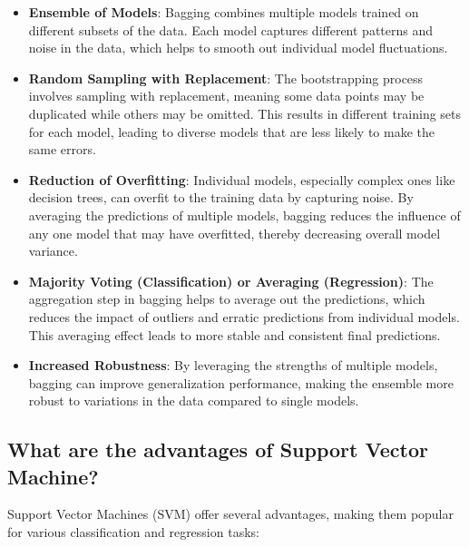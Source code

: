 \begin{itemize}
    \item \textbf{Ensemble of Models}: Bagging combines multiple models trained on different subsets of the data. Each model captures different patterns and noise in the data, which helps to smooth out individual model fluctuations.
    \item \textbf{Random Sampling with Replacement}: The bootstrapping process involves sampling with replacement, meaning some data points may be duplicated while others may be omitted. This results in different training sets for each model, leading to diverse models that are less likely to make the same errors.
    \item \textbf{Reduction of Overfitting}: Individual models, especially complex ones like decision trees, can overfit to the training data by capturing noise. By averaging the predictions of multiple models, bagging reduces the influence of any one model that may have overfitted, thereby decreasing overall model variance.
    \item \textbf{Majority Voting (Classification) or Averaging (Regression)}: The aggregation step in bagging helps to average out the predictions, which reduces the impact of outliers and erratic predictions from individual models. This averaging effect leads to more stable and consistent final predictions.
    \item \textbf{Increased Robustness}: By leveraging the strengths of multiple models, bagging can improve generalization performance, making the ensemble more robust to variations in the data compared to single models.
\end{itemize}


\subsection{What are the advantages of Support Vector Machine?}

Support Vector Machines (SVM) offer several advantages, making them popular for various classification and regression tasks:

